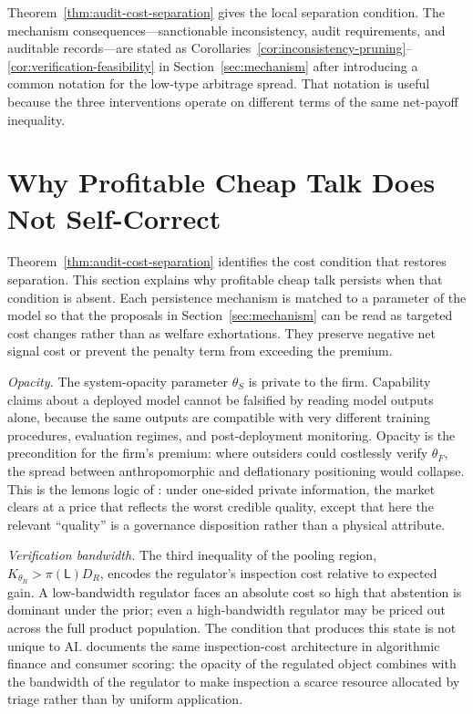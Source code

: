 \documentclass[preprint,authoryear]{elsarticle}
\theoremstyle{definition}
\theoremstyle{plain}
\begin{document}
Theorem~\ref{thm:audit-cost-separation} gives the local separation condition.
The mechanism consequences---sanctionable inconsistency, audit requirements,
and auditable records---are stated as
Corollaries~\ref{cor:inconsistency-pruning}--\ref{cor:verification-feasibility}
in Section~\ref{sec:mechanism} after introducing a common notation for
the low-type arbitrage spread.  That notation is useful because the three
interventions operate on different terms of the same net-payoff inequality.

\section{Why Profitable Cheap Talk Does Not Self-Correct}
\label{sec:persistence}

Theorem~\ref{thm:audit-cost-separation} identifies the cost condition that restores separation.  This section explains why profitable cheap talk persists when that condition is absent.  Each persistence mechanism is matched to a parameter of the model so that the proposals in Section~\ref{sec:mechanism} can be read as targeted cost changes rather than as welfare exhortations. They preserve negative net signal cost or prevent the penalty term from exceeding the premium.

\emph{Opacity.} The system-opacity parameter $\theta_S$ is private to the firm. Capability claims about a deployed model cannot be falsified by reading model outputs alone, because the same outputs are compatible with very different training procedures, evaluation regimes, and post-deployment monitoring. Opacity is the precondition for the firm's premium: where outsiders could costlessly verify $\theta_F$, the spread between anthropomorphic and deflationary positioning would collapse. This is the lemons logic of \citet{akerlof1970}: under one-sided private information, the market clears at a price that reflects the worst credible quality, except that here the relevant ``quality'' is a governance disposition rather than a physical attribute.

\emph{Verification bandwidth.} The third inequality of the pooling region, $K_{\theta_R}>\pi(\mathsf{L})D_R$, encodes the regulator's inspection cost relative to expected gain. A low-bandwidth regulator faces an absolute cost so high that abstention is dominant under the prior; even a high-bandwidth regulator may be priced out across the full product population. The condition that produces this state is not unique to AI. \citet{pasquale2015} documents the same inspection-cost architecture in algorithmic finance and consumer scoring: the opacity of the regulated object combines with the bandwidth of the regulator to make inspection a scarce resource allocated by triage rather than by uniform application.
\end{document}

